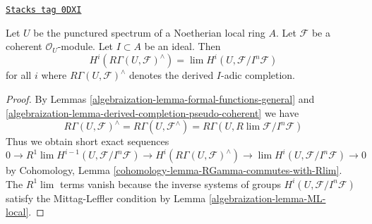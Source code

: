 \begin{lemma}
\label{algebraization-lemma-compare-with-derived-completion}
\href{https://stacks.math.columbia.edu/tag/0DXI}{\texttt{Stacks tag 0DXI}}

Let $U$ be the punctured spectrum of a Noetherian local ring $A$.
Let $\mathcal{F}$ be a coherent $\mathcal{O}_U$-module.
Let $I \subset A$ be an ideal. Then
$$
H^i(R\Gamma(U, \mathcal{F})^\wedge) =
\lim H^i(U, \mathcal{F}/I^n\mathcal{F})
$$
for all $i$ where $R\Gamma(U, \mathcal{F})^\wedge$ denotes
the derived $I$-adic completion.
\end{lemma}

\begin{proof}

By Lemmas \ref{algebraization-lemma-formal-functions-general} and
\ref{algebraization-lemma-derived-completion-pseudo-coherent} we have
$$
R\Gamma(U, \mathcal{F})^\wedge =
R\Gamma(U, \mathcal{F}^\wedge) =
R\Gamma(U, R\lim \mathcal{F}/I^n\mathcal{F})
$$
Thus we obtain short exact sequences
$$
0 \to R^1\lim H^{i - 1}(U, \mathcal{F}/I^n\mathcal{F}) \to
H^i(R\Gamma(U, \mathcal{F})^\wedge) \to
\lim H^i(U, \mathcal{F}/I^n\mathcal{F}) \to 0
$$
by Cohomology, Lemma \ref{cohomology-lemma-RGamma-commutes-with-Rlim}.
The $R^1\lim$ terms vanish because the inverse systems of groups
$H^i(U, \mathcal{F}/I^n\mathcal{F})$ satisfy the Mittag-Leffler condition
by Lemma \ref{algebraization-lemma-ML-local}.
\end{proof}

